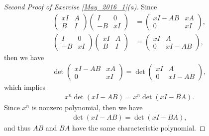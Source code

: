 \documentclass[11pt]{article}
\theoremstyle{definition}
\numberwithin{equation}{subsection}
\begin{document}
\begin{proof}[Second Proof of Exercise \ref{May_2016_1}(a)]
Since
\begin{align*}
    \begin{pmatrix}
        xI & A \\
        B & I
    \end{pmatrix}\begin{pmatrix}
        I & 0 \\
        -B & xI
    \end{pmatrix} & = \begin{pmatrix}
        xI - AB & xA \\
        0 & xI
    \end{pmatrix}, \\
    \begin{pmatrix}
        I & 0 \\
        -B & xI
    \end{pmatrix}\begin{pmatrix}
        xI & A \\
        B & I
    \end{pmatrix} & = \begin{pmatrix}
        xI & A \\
        0 & xI - AB
    \end{pmatrix},
\end{align*}
then we have
\begin{align*}
    \det \begin{pmatrix}
        xI - AB & xA \\
        0 & xI
    \end{pmatrix} = \det \begin{pmatrix}
        xI & A \\
        0 & xI - AB
    \end{pmatrix},
\end{align*}
which implies 
\begin{align*}
    x^n \det (xI - AB) = x^n \det (xI - BA).
\end{align*}
Since $x^n$ is nonzero polynomial, then we have
\begin{align*}
    \det (xI - AB) = \det (xI - BA),
\end{align*}
and thus $AB$ and $BA$ have the same characteristic polynomial.
\end{proof}

\medskip
\end{document}
